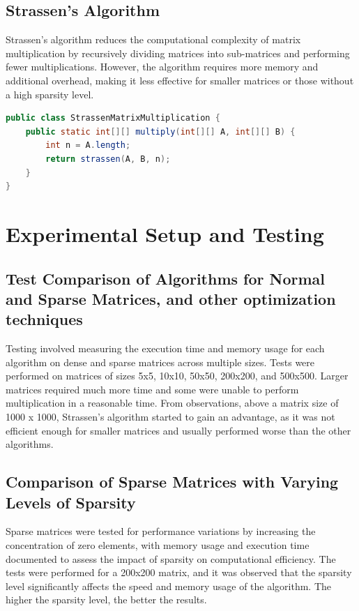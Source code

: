 \documentclass{article}
\begin{document}
\subsection{Strassen’s Algorithm}
Strassen’s algorithm reduces the computational complexity of matrix multiplication by recursively dividing matrices into sub-matrices and performing fewer multiplications. However, the algorithm requires more memory and additional overhead, making it less effective for smaller matrices or those without a high sparsity level.

\begin{lstlisting}[language=Java]
public class StrassenMatrixMultiplication {
    public static int[][] multiply(int[][] A, int[][] B) {
        int n = A.length;
        return strassen(A, B, n);
    }
}
\end{lstlisting}

\section{Experimental Setup and Testing}

\subsection{Test Comparison of Algorithms for Normal and Sparse Matrices, and other optimization techniques}
Testing involved measuring the execution time and memory usage for each algorithm on dense and sparse matrices across multiple sizes. Tests were performed on matrices of sizes 5x5, 10x10, 50x50, 200x200, and 500x500. Larger matrices required much more time and some were unable to perform multiplication in a reasonable time.  
From observations, above a matrix size of 1000 x 1000, Strassen's algorithm started to gain an advantage, as it was not efficient enough for smaller matrices and usually performed worse than the other algorithms.

\subsection{Comparison of Sparse Matrices with Varying Levels of Sparsity}
Sparse matrices were tested for performance variations by increasing the concentration of zero elements, with memory usage and execution time documented to assess the impact of sparsity on computational efficiency.  
The tests were performed for a 200x200 matrix, and it was observed that the sparsity level significantly affects the speed and memory usage of the algorithm. The higher the sparsity level, the better the results.
\end{document}
